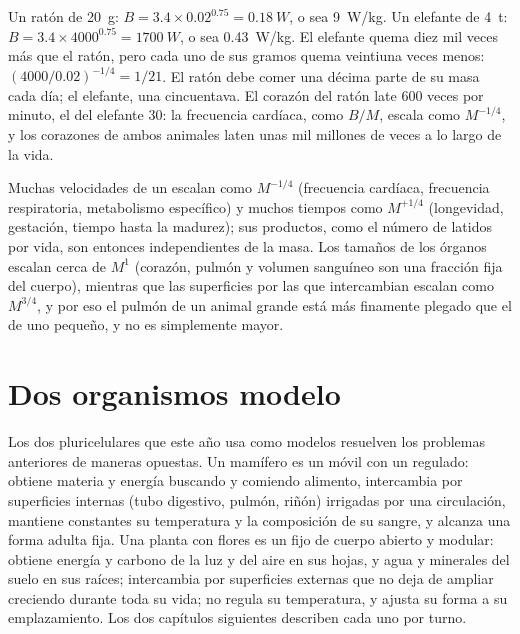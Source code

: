 \begin{example}\label{ex:b1:organism-environment:mouseelephant}
Un ratón de \qty{20}{g}: $B = 3.4\times 0.02^{0.75} = \qty{0.18}{W}$, o sea
\qty{9}{W/kg}. Un elefante de \qty{4}{t}: $B = 3.4\times 4000^{0.75} =
\qty{1700}{W}$, o sea \qty{0.43}{W/kg}. El elefante quema diez mil veces
más que el ratón, pero cada uno de sus gramos quema veintiuna veces menos:
$(4000/0.02)^{-1/4} = 1/21$. El ratón debe comer una décima parte de su masa
cada día; el elefante, una cincuentava. El corazón del ratón late
\qty{600}{} veces por minuto, el del elefante \qty{30}{}: la frecuencia
cardíaca, como $B/M$, escala como $M^{-1/4}$, y los corazones de ambos
animales laten unas mil millones de veces a lo largo de la vida.
\end{example}

\begin{remark}\label{rem:b1:organism-environment:consequences}
Muchas velocidades de un  escalan como $M^{-1/4}$ (frecuencia
cardíaca, frecuencia respiratoria, metabolismo específico) y muchos tiempos
como $M^{+1/4}$ (longevidad, gestación, tiempo hasta la madurez); sus
productos, como el número de latidos por vida, son entonces independientes
de la masa. Los tamaños de los órganos escalan cerca de $M^{1}$ (corazón,
pulmón y volumen sanguíneo son una fracción fija del cuerpo), mientras que
las superficies por las que intercambian escalan como $M^{3/4}$, y por eso
el pulmón de un animal grande está más finamente plegado que el de uno
pequeño, y no es simplemente mayor.
\end{remark}

\section{Dos organismos modelo}

\begin{proposition}\label{prop:b1:organism-environment:models}
Los dos  pluricelulares que este año usa como modelos resuelven
los problemas anteriores de maneras opuestas. Un mamífero es un 
móvil con un  regulado: obtiene materia y energía buscando y
comiendo alimento, intercambia por superficies internas (tubo digestivo,
pulmón, riñón) irrigadas por una circulación, mantiene constantes su
temperatura y la composición de su sangre, y alcanza una forma adulta fija.
Una planta con flores es un  fijo de cuerpo abierto y modular:
obtiene energía y carbono de la luz y del aire en sus hojas, y agua y
minerales del suelo en sus raíces; intercambia por superficies externas que
no deja de ampliar creciendo durante toda su vida; no regula su temperatura,
y ajusta su forma a su emplazamiento. Los dos capítulos siguientes describen
cada uno por turno.
\end{proposition}

